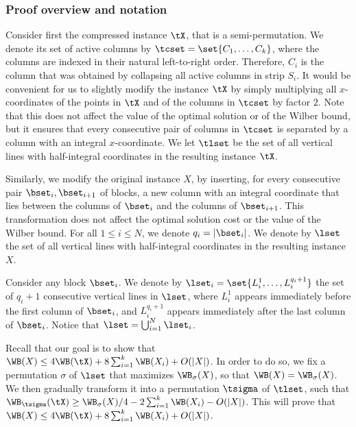 \documentclass[11pt]{article}
\numberwithin{equation}{section}
\theoremstyle{definition}
\theoremstyle{plain}
\begin{document}
%
%
%
%
\subsubsection{Proof overview and notation}

%
%
%
%

Consider first the compressed instance $\tX$, that is a semi-permutation. We denote its set of active columns by $\tcset=\set{C_1,\ldots,C_k}$, where the columns are indexed in their natural left-to-right order. Therefore, $C_i$ is the column that was obtained by collapsing all active columns in strip $S_i$. %
%
%
%
%
It would be convenient for us to slightly modify the instance $\tX$ by simply multiplying all $x$-coordinates of the points in $\tX$ and of the columns in $\tcset$ by factor $2$. Note that this does not affect the value of the optimal solution or of the Wilber bound, but it ensures that every consecutive pair of columns in $\tcset$ is separated by a column with an integral $x$-coordinate. We let $\tlset$ be the set of all vertical lines with half-integral coordinates in the resulting instance $\tX$.

Similarly, we modify the original instance $X$, by inserting, for every consecutive pair $\bset_i,\bset_{i+1}$ of blocks, a new column with an integral coordinate that lies between the columns of $\bset_{i}$ and the columns of $\bset_{{i+1}}$. This transformation does not affect the optimal solution cost or the value of the Wilber bound. For all $1\leq i\leq N$, we denote $q_i=|\bset_i|$.
%
We denote by $\lset$ the set of all vertical lines with half-integral coordinates in the resulting instance $X$.

Consider any block $\bset_i$. We denote by $\lset_i=\set{L_i^1,\ldots,L_i^{q_i+1}}$ the set of $q_i+1$ consecutive vertical lines in $\lset$, where $L_i^1$ appears immediately before the first column of $\bset_i$, and $L_i^{q_i+1}$ appears immediately after the last column of $\bset_i$. Notice that $\lset=\bigcup_{i=1}^N\lset_i$.

Recall that our goal is to show that $\WB(X)\leq 4\WB(\tX)+8\sum_{i=1}^k\WB(X_i)+O(|X|)$. In order to do so, we fix a permutation $\sigma$ of $\lset$ that maximizes $\WB_{\sigma}(X)$, so that $\WB(X)=\WB_{\sigma}(X)$. We then gradually transform it into a permutation $\tsigma$ of $\tlset$, such that $\WB_{\tsigma}(\tX)\geq \WB_{\sigma}(X)/4-2\sum_{i=1}^k\WB(X_i)-O(|X|)$. This will prove that $\WB(X)\leq 4\WB(\tX)+8\sum_{i=1}^k\WB(X_i)+O(|X|)$.
\end{document}
